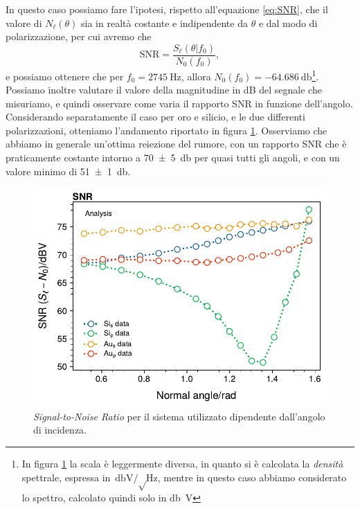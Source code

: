 \documentclass[
    prb,altaffilletter,citeautoscript,
    amsmath,amssymb,
    showpacs,showkeys,floatfix,
    reprint
]{revtex4-1}
\begin{document}
In questo caso possiamo fare l'ipotesi, rispetto all'equazione \eqref{eq:SNR}, che il valore di $N_\ell (\theta)$ sia in realtà costante e indipendente da $\theta$ e dal modo di polarizzazione, per cui avremo che \begin{equation}
    \text{SNR} = \frac{S_\ell(\theta | f_0)}{N_0(f_0)},
\end{equation} e possiamo ottenere che per $f_0=\SI{2745}{\hertz}$, allora $N_0(f_0) = \SI{-64.686}{\decibel}$\footnote{In figura \ref{fig:SNR} la scala è leggermente diversa, in quanto si è calcolata la \emph{densità} spettrale, espressa in $\si{\decibel\volt\per\sqrt\hertz}$, mentre in questo caso abbiamo considerato lo spettro, calcolato quindi solo in \si{\decibel\volt}}. Possiamo inoltre valutare il valore della magnitudine in dB del segnale che misuriamo, e quindi osservare come varia il rapporto SNR in funzione dell'angolo. Considerando separatamente il caso per oro e silicio, e le due differenti polarizzazioni, otteniamo l'andamento riportato in figura \ref{fig:SNR}. Osserviamo che abbiamo in generale un'ottima reiezione del rumore, con un rapporto SNR che è praticamente costante intorno a \SI[uncertainty-mode=separate]{70(5)}{\decibel} per quasi tutti gli angoli, e con un valore minimo di \SI[uncertainty-mode=separate]{51(1)}{\decibel}. 

\begin{figure}
    \centering
    \includegraphics[width=\linewidth]{figures/SNR.pdf}
    \caption{\emph{Signal-to-Noise Ratio} per il sistema utilizzato dipendente dall'angolo di incidenza.}
    \label{fig:SNR}
\end{figure}
\end{document}
